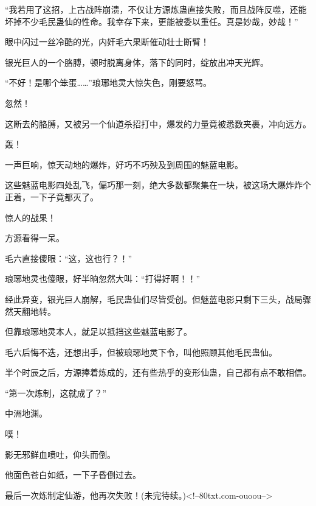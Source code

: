\begin{this_body}
“我若用了这招，上古战阵崩溃，不仅让方源炼蛊直接失败，而且战阵反噬，还能坏掉不少毛民蛊仙的性命。我幸存下来，更能被委以重任。真是妙哉，妙哉！”

眼中闪过一丝冷酷的光，内奸毛六果断催动壮士断臂！

银光巨人的一个胳膊，顿时脱离身体，落下的同时，绽放出冲天光辉。

“不好！是哪个笨蛋……”琅琊地灵大惊失色，刚要怒骂。

忽然！

这断去的胳膊，又被另一个仙道杀招打中，爆发的力量竟被悉数夹裹，冲向远方。

轰！

一声巨响，惊天动地的爆炸，好巧不巧殃及到周围的魅蓝电影。

这些魅蓝电影四处乱飞，偏巧那一刻，绝大多数都聚集在一块，被这场大爆炸炸个正着，一下子竟都灭了。

惊人的战果！

方源看得一呆。

毛六直接傻眼：“这，这也行？！”

琅琊地灵也傻眼，好半晌忽然大叫：“打得好啊！！”

经此异变，银光巨人崩解，毛民蛊仙们尽皆受创。但魅蓝电影只剩下三头，战局骤然天翻地转。

但靠琅琊地灵本人，就足以抵挡这些魅蓝电影了。

毛六后悔不迭，还想出手，但被琅琊地灵下令，叫他照顾其他毛民蛊仙。

半个时辰之后，方源捧着炼成的，还有些热乎的变形仙蛊，自己都有点不敢相信。

“第一次炼制，这就成了？”

中洲地渊。

噗！

影无邪鲜血喷吐，仰头而倒。

他面色苍白如纸，一下子昏倒过去。

最后一次炼制定仙游，他再次失败！(未完待续。)<!--80txt.com-ouoou-->

\end{this_body}

